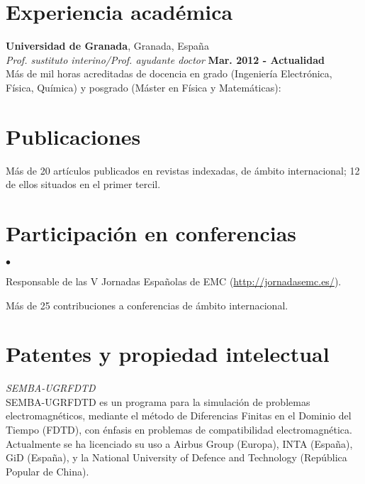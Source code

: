 \documentclass[margin,line]{res}
\newenvironment{list2}{
  \begin{list}{$\bullet$}{%
      \setlength{\itemsep}{0in}
      \setlength{\parsep}{0in} \setlength{\parskip}{0in}
      \setlength{\topsep}{0in} \setlength{\partopsep}{0in} 
      \setlength{\leftmargin}{0.2in}}}{\end{list}}
\begin{document}
\begin{resume}
\section{\sc Experiencia académica}
{\bf Universidad de Granada}, Granada, España\\
{\em Prof. sustituto interino/Prof. ayudante doctor} \hfill {\bf Mar. 2012 - Actualidad}\\
Más de mil horas acreditadas de docencia en grado (Ingeniería Electrónica, Física, Química) y posgrado (Máster en Física y Matemáticas):

\begin{minipage}{\textwidth}
	\section{\sc Publicaciones}
    Más de 20 artículos publicados en revistas indexadas, de ámbito internacional; 12 de ellos situados en el primer tercil.
\end{minipage}


\section{\sc Participación en conferencias}
\begin{minipage}{\textwidth}
  \begin{list2}
    \item Responsable de las V Jornadas Españolas de EMC (\url{http://jornadasemc.es/}).
    \item Más de 25 contribuciones a conferencias de ámbito internacional.
  \end{list2} 
\end{minipage}

\section{\sc Patentes y propiedad intelectual}
\begin{minipage}{\textwidth}
  {\em SEMBA-UGRFDTD}\\
  SEMBA-UGRFDTD es un programa para la simulación de problemas electromagnéticos, mediante el método de Diferencias Finitas en el Dominio del Tiempo (FDTD), con énfasis en problemas de compatibilidad electromagnética. Actualmente se ha licenciado su uso a Airbus Group (Europa), INTA (España), GiD (España), y la National University of Defence and Technology (República Popular de China).
\end{minipage}




\end{resume}
\end{document}
